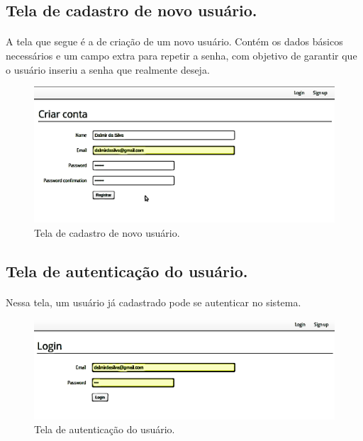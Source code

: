 \documentclass[11pt]{article}
\begin{document}
    \subsection{Tela de cadastro de novo usuário.}
    
    \paragraph{}
    A tela que segue é a de criação de um novo usuário. Contém os dados 
    básicos necessários e um campo extra para repetir a senha, com objetivo de
    garantir que o usuário inseriu a senha que realmente deseja.
    
    \begin{figure}[h!]
      \centering
      \includegraphics[width=.9\textwidth]{create_user.png}
      \caption{Tela de cadastro de novo usuário.}
    \end{figure}
    
    \subsection{Tela de autenticação do usuário.}
    
    \paragraph{}

    Nessa tela, um usuário já cadastrado pode se autenticar no sistema.
        
    \begin{figure}[h!]
      \centering
      \includegraphics[width=.9\textwidth]{authenticate_user.png}
      \caption{Tela de autenticação do usuário.}
    \end{figure}
        
\end{document}
